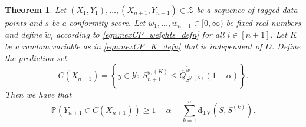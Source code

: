 \documentclass[11pt, titlepage]{article} %
\newcommand{\R}{\mathrm}
\newcommand{\Prob}[1]{\mathbb{P}\left( #1 \right)}
\numberwithin{equation}{section}
\newtheorem{theorem}{Theorem}
\theoremstyle{definition}
\numberwithin{theorem}{section}
\numberwithin{lemma}{section}
\numberwithin{corollary}{section}
\numberwithin{proposition}{section}
\numberwithin{definition}{section}
\numberwithin{remark}{section}
\begin{document}
\begin{theorem}
    Let \((X_1, Y_1), \ldots, (X_{n+1}, Y_{n+1}) \in \mathcal{Z}\) be a sequence of tagged data points and \(s\) be a conformity score. Let \(w_1, \ldots, w_{n+1} \in [0, \infty)\) be fixed real numbers and define \(\tilde{w}_i\) according to \eqref{eqn:nexCP_weights_defn} for all \(i \in [n+1]\). Let \(K\) be a random variable as in \eqref{eqn:nexCP_K_defn} that is independent of \(D\). Define the prediction set \begin{equation}
        C(X_{n+1}) = \left\{ y \in \mathcal{Y} : \ S_{n+1}^{y, (K)} \leq \hat{Q}_{S^{y, (K)}}^{\tilde{w}}(1-\alpha)  \right\}.
    \label{eqn:nexCP_prediction_set}
    \end{equation} Then we have that \begin{equation}
        \Prob{Y_{n+1} \in C(X_{n+1})}  \geq 1-\alpha - \sum_{k=1}^n \R{d_{TV}}(S, S^{(k)}).
    \end{equation}
\label{thm:nexCP_coverage}
\end{theorem}
\end{document}
